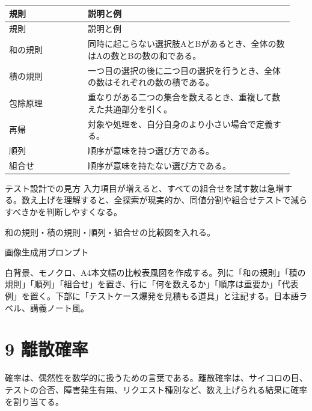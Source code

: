 \documentclass[uplatex,dvipdfmx,a4paper,10pt]{jsarticle}
\begin{document}
\begin{longtable}{>{\raggedright\arraybackslash}p{0.26\linewidth} >{\raggedright\arraybackslash}p{0.68\linewidth}}
\toprule
規則 & 説明と例 \\
\midrule
\endfirsthead
\toprule
規則 & 説明と例 \\
\midrule
\endhead
和の規則 & 同時に起こらない選択肢AとBがあるとき、全体の数はAの数とBの数の和である。 \\
積の規則 & 一つ目の選択の後に二つ目の選択を行うとき、全体の数はそれぞれの数の積である。 \\
包除原理 & 重なりがある二つの集合を数えるとき、重複して数えた共通部分を引く。 \\
再帰 & 対象や処理を、自分自身のより小さい場合で定義する。 \\
順列 & 順序が意味を持つ選び方である。 \\
組合せ & 順序が意味を持たない選び方である。 \\
\bottomrule
\end{longtable}
\begin{infobox}{テスト設計での見方}
入力項目が増えると、すべての組合せを試す数は急増する。数え上げを理解すると、全探索が現実的か、同値分割や組合せテストで減らすべきかを判断しやすくなる。
\end{infobox}
\begin{todobox}
和の規則・積の規則・順列・組合せの比較図を入れる。

画像生成用プロンプト

白背景、モノクロ、A4本文幅の比較表風図を作成する。列に「和の規則」「積の規則」「順列」「組合せ」を置き、行に「何を数えるか」「順序は重要か」「代表例」を置く。下部に「テストケース爆発を見積もる道具」と注記する。日本語ラベル、講義ノート風。
\end{todobox}
\section{9 離散確率}
確率は、偶然性を数学的に扱うための言葉である。離散確率は、サイコロの目、テストの合否、障害発生有無、リクエスト種別など、数え上げられる結果に確率を割り当てる。
\end{document}

